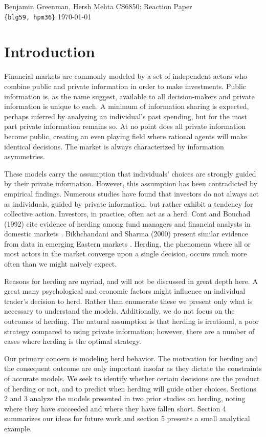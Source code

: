 \documentclass{article}
\renewcommand\maketitle{
\begin{flushleft}
{%
\large{%
Benjamin Greenman,
Hersh Mehta
\hfill
CS6850: Reaction Paper
\\\texttt{\{blg59, hpm36\}} \hfill \today
}}\\
\hrulefill
\end{flushleft}
}
\begin{document}
\maketitle

\section{Introduction}
Financial markets are commonly modeled by a set of independent actors who combine public and private information in order to make investments.
Public information is, as the name suggest, available to all decision-makers and private information is unique to each.
A minimum of information sharing is expected, perhaps inferred by analyzing an individual's past spending, but for the most part private information remains so.
At no point does all private information become public, creating an even playing field where rational agents will make identical decisions.
The market is always characterized by information asymmetries.

These models carry the assumption that individuals' choices are strongly guided by their private information.
However, this assumption has been contradicted by empirical findings. 
Numerous studies have found that investors do not always act as individuals, guided by private information, but rather exhibit a tendency for collective action.
Investors, in practice, often act as a herd.
Cont and Bouchad (1992) cite evidence of herding among fund managers and financial analysts in domestic markets \cite[174]{cont}.
Bikhchandani and Sharma (2000) present similar evidence from data in emerging Eastern markets \cite{bikhchandani}.
Herding, the phenomena where all or most actors in the market converge upon a single decision, occurs much more often than we might naively expect.

Reasons for herding are myriad, and will not be discussed in great depth here.
A great many psychological and economic factors might influence an individual trader's decision to herd. 
Rather than enumerate these we present only what is necessary to understand the models.
Additionally, we do not focus on the outcomes of herding.
The natural assumption is that herding is irrational, a poor strategy compared to using private information; however, there are a number of cases where herding is the optimal strategy.

Our primary concern is modeling herd behavior.
The motivation for herding and the consequent outcome are only important insofar as they dictate the constraints of accurate models.
We seek to identify whether certain decisions are the product of herding or not, and to predict when herding will guide other choices.
Sections 2 and 3 analyze the models presented in two prior studies on herding, noting where they have succeeded and where they have fallen short. 
Section 4 summarizes our ideas for future work and section 5 presents a small analytical example.
\end{document}
